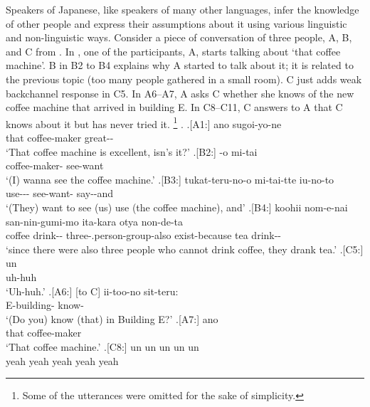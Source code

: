 Speakers of Japanese, like speakers of many other languages,
infer the knowledge of other people and
express their assumptions about it using various linguistic and non-linguistic ways.
Consider a piece of conversation of three people, A, B, and C
from  \cite{Den_2007_SAC}.
In \Next[-A1],
one of the participants, A, starts talking about  `that coffee machine'.
B in B2 to B4 explains why A started to talk about it;
it is related to the previous topic (too many people gathered in a small room).
C just adds weak backchannel response in C5.
In A6--A7,
A asks C whether she knows of the new coffee machine that arrived in building E.
In C8--C11,
C answers to A that
C knows about it but has never tried it.%
	\footnote{
	Some of the utterances were omitted for the sake of simplicity.
	}
%
\ex.
 \ag.[A1:] ano  sugoi-yo-ne \\
      that coffee-maker great-- \\
      `That coffee machine is excellent, isn's it?'
 \bg.[B2:] -o mi-tai \\
          coffee-maker- see-want \\
          `(I) wanna see the coffee machine.'
 \bg.[B3:] tukat-teru-no-o mi-tai-tte iu-no-to \\
           use--- see-want- say--and \\
           `(They) want to see (us) use (the coffee machine), and'
 \bg.[B4:] koohii nom-e-nai san-nin-gumi-mo ita-kara otya non-de-ta \\
           coffee drink-- three-.person-group-also exist-because tea drink-- \\
           `since there were also three people who cannot drink coffee, they drank tea.'
 \bg.[C5:] un \\
           uh-huh \\
           `Uh-huh.'
 \bg.[A6:] [to C] ii-too-no sit-teru: \\
           {} {} E-building- know- \\
           `(Do you) know (that) in Building E?'
 \bg.[A7:] ano  \\
           that coffee-maker \\
           `That coffee machine.'
 \bg.[C8:] un un un un un \\
           yeah yeah yeah yeah yeah \\
